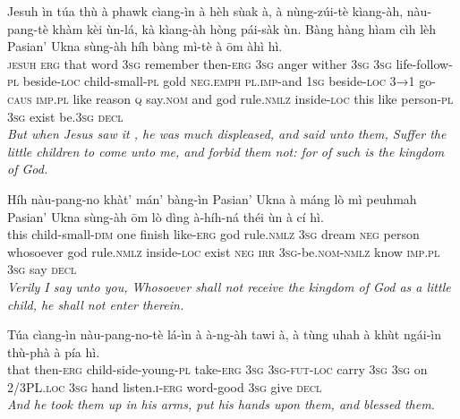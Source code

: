 \documentclass[11pt,a4paper]{article}
\begin{document}
\begin{exe}
\gll Jesuh ìn túa thù à phawk cìang-ìn à hèh sùak à, à nùng-zúi-tè kìang-àh, nàu-pang-tè khàm kèi ùn-lá, kà kìang-àh hòng pái-sàk ùn. Bàng hàng hìam cìh lèh Pasian' Ukna sùng-àh híh bàng mì-tè à ōm àhì hì. \\
     \textsc{jesuh} \textsc{erg} that word \textsc{3sg} remember then-\textsc{erg} \textsc{3sg} anger wither \textsc{3sg} \textsc{3sg} life-follow-\textsc{pl} beside-\textsc{loc} child-small-\textsc{pl} gold \textsc{neg}.\textsc{emph} \textsc{pl}.\textsc{imp}-and \textsc{1sg} beside-\textsc{loc} \textsc{3→1} go-\textsc{caus} \textsc{imp}.\textsc{pl} like reason \textsc{q} say.\textsc{nom} and god rule.\textsc{nmlz} inside-\textsc{loc} this like person-\textsc{pl} \textsc{3sg} exist be.\textsc{3sg} \textsc{decl} \\
\glt \textcolor{kjvcolor}{\textit{But when Jesus saw it , he was much displeased, and said unto them, Suffer the little children to come unto me, and forbid them not: for of such is the kingdom of God.}}

\gll Híh nàu-pang-no khàt' mán' bàng-ìn Pasian' Ukna à máng lò mì peuhmah Pasian' Ukna sùng-àh ōm lò dìng à-híh-ná théi ùn à cí hì. \\
     this child-small-\textsc{dim} one finish like-\textsc{erg} god rule.\textsc{nmlz} \textsc{3sg} dream \textsc{neg} person whosoever god rule.\textsc{nmlz} inside-\textsc{loc} exist \textsc{neg} \textsc{irr} \textsc{3sg}-be.\textsc{nom}-\textsc{nmlz} know \textsc{imp}.\textsc{pl} \textsc{3sg} say \textsc{decl} \\
\glt \textcolor{kjvcolor}{\textit{Verily I say unto you, Whosoever shall not receive the kingdom of God as a little child, he shall not enter therein.}}

\gll Túa cìang-ìn nàu-pang-no-tè lá-ìn à à-ng-àh tawi à, à tùng uhah à khùt ngái-ìn thù-phà à pía hì. \\
     that then-\textsc{erg} child-side-young-\textsc{pl} take-\textsc{erg} \textsc{3sg} \textsc{3sg}-\textsc{fut}-\textsc{loc} carry \textsc{3sg} \textsc{3sg} on 2/3PL.\textsc{loc} \textsc{3sg} hand listen.\textsc{i}-\textsc{erg} word-good \textsc{3sg} give \textsc{decl} \\
\glt \textcolor{kjvcolor}{\textit{And he took them up in his arms, put his hands upon them, and blessed them.}}


\end{exe}
\end{document}

